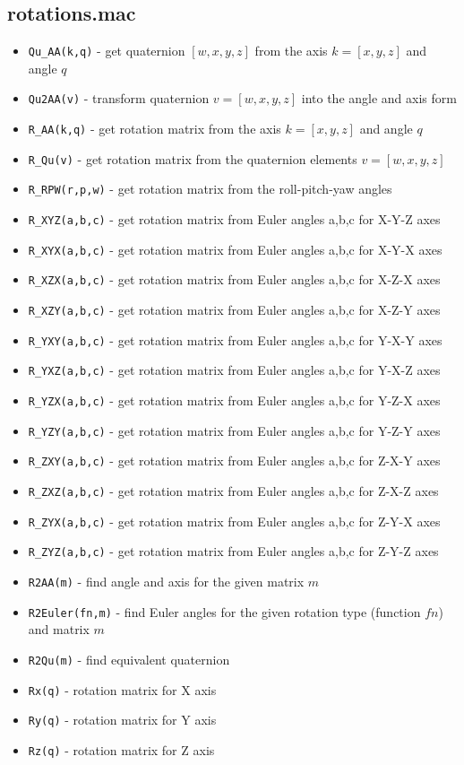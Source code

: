 \documentclass{article}
\begin{document}
\subsection{rotations.mac}

\begin{itemize}
    \item \texttt{Qu\_AA(k,q)} - get quaternion $[w,x,y,z]$ from the axis $k = [x,y,z]$ and angle $q$ 
    \item \texttt{Qu2AA(v)} - transform quaternion $v = [w,x,y,z]$ into the angle and axis form 
    \item \texttt{R\_AA(k,q)} - get rotation matrix from the axis $k = [x,y,z]$ and angle $q$ 
    \item \texttt{R\_Qu(v)} - get rotation matrix from the quaternion elements $v = [w,x,y,z]$
    \item \texttt{R\_RPW(r,p,w)} - get rotation matrix from the roll-pitch-yaw angles 
    \item \texttt{R\_XYZ(a,b,c)} - get rotation matrix from Euler angles a,b,c for X-Y-Z axes 
    \item \texttt{R\_XYX(a,b,c)} - get rotation matrix from Euler angles a,b,c for X-Y-X axes
    \item \texttt{R\_XZX(a,b,c)} - get rotation matrix from Euler angles a,b,c for X-Z-X axes
    \item \texttt{R\_XZY(a,b,c)} - get rotation matrix from Euler angles a,b,c for X-Z-Y axes
    \item \texttt{R\_YXY(a,b,c)} - get rotation matrix from Euler angles a,b,c for Y-X-Y axes
    \item \texttt{R\_YXZ(a,b,c)} - get rotation matrix from Euler angles a,b,c for Y-X-Z axes
    \item \texttt{R\_YZX(a,b,c)} - get rotation matrix from Euler angles a,b,c for Y-Z-X axes
    \item \texttt{R\_YZY(a,b,c)} - get rotation matrix from Euler angles a,b,c for Y-Z-Y axes
    \item \texttt{R\_ZXY(a,b,c)} - get rotation matrix from Euler angles a,b,c for Z-X-Y axes
    \item \texttt{R\_ZXZ(a,b,c)} - get rotation matrix from Euler angles a,b,c for Z-X-Z axes
    \item \texttt{R\_ZYX(a,b,c)} - get rotation matrix from Euler angles a,b,c for Z-Y-X axes
    \item \texttt{R\_ZYZ(a,b,c)} - get rotation matrix from Euler angles a,b,c for Z-Y-Z axes
    \item \texttt{R2AA(m)} - find angle and axis for the given matrix $m$ 
    \item \texttt{R2Euler(fn,m)} - find Euler angles for the given rotation type (function $fn$) and matrix $m$ 
    \item \texttt{R2Qu(m)} - find equivalent quaternion 
    \item \texttt{Rx(q)} - rotation matrix for X axis
    \item \texttt{Ry(q)} - rotation matrix for Y axis
    \item \texttt{Rz(q)} - rotation matrix for Z axis
\end{itemize}
\end{document}
